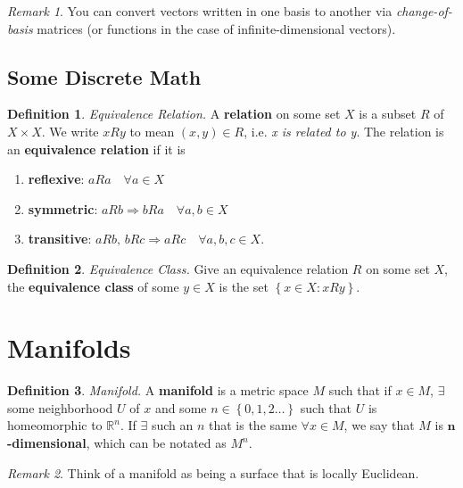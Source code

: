 \documentclass[10pt,landscape]{article}
\theoremstyle{definition}
\newtheorem{definition}{Definition}[section]
\theoremstyle{remark}
\newtheorem*{remark}{Remark}
\newcommand{\Rn}{\mathbb{R}^n}
\begin{document}
\begin{multicols*}{3}
\begin{remark}
You can convert vectors written in one basis to another via \textit{change-of-basis} matrices (or functions in the case of infinite-dimensional vectors).
\end{remark}

\subsection{Some Discrete Math}
\begin{definition}{\textit{Equivalence Relation.}}
A \textbf{relation} on some set $X$ is a subset $R$ of $X\times X$. We write $x R y$ to mean $(x, y)\in R$, i.e. \textit{x is related to y}.
The relation is an \textbf{equivalence relation} if it is
\begin{enumerate}
    \item \textbf{reflexive}: $aRa \quad \forall a\in X$
    \item \textbf{symmetric}: $aRb \Rightarrow bRa \quad \forall a,b\in X$
    \item \textbf{transitive}: $aRb,\, bRc \Rightarrow aRc \quad \forall a,b,c\in X$.
\end{enumerate}
\end{definition}

\begin{definition}{\textit{Equivalence Class.}}
Give an equivalence relation $R$ on some set $X$, the \textbf{equivalence class} of some $y\in X$ is the set $\left\{x\in X: xRy\right\}$.
\end{definition}

\section{Manifolds}

\theoremstyle{definition}
\begin{definition}{\textit{Manifold.}}
A \textbf{manifold} is a metric space $M$ such that if $x\in M$, $\exists$ some neighborhood $U$ of $x$ and some $n\in\left\{0,1,2\ldots\right\}$ such that $U$ is homeomorphic to $\Rn$. If $\exists$ such an $n$ that is the same $\forall x\in M$, we say that $M$ is \textbf{$\bm{n}$-dimensional}, which can be notated as $M^n$.
\end{definition}

\begin{remark}
Think of a manifold as being a surface that is locally Euclidean.
\end{remark}


\end{multicols*}
\end{document}
